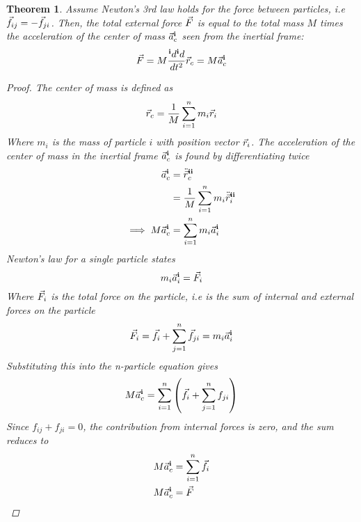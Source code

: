 \documentclass{article}
\newtheorem{theorem}{Theorem}
\begin{document}
\begin{theorem}
    Assume Newton's 3rd law holds for the force between particles, i.e $\vec{f}_{ij} = -\vec{f}_{ji}$.
    Then, the total external force $\vec{F}$ is equal to the total mass $M$ times the acceleration of the 
    center of mass $\vec{a}_c^{\mathbf{i}}$ seen from the inertial frame:
    $$\vec{F} = M\frac{{}^{\mathbf{i}}d{}^{\mathbf{i}}d}{dt^2}\vec{r}_c = M\vec{a}_c^{\mathbf{i}}$$
    \begin{proof}
        The center of mass is defined as
        $$\vec{r}_c = \frac{1}{M}\sum_{i=1}^nm_i\vec{r}_i$$
        Where $m_i$ is the mass of particle $i$ with position vector $\vec{r}_i$. The acceleration of the center of mass in the inertial frame $\vec{a}_c^{\mathbf{i}}$ is found by differentiating twice
        \begin{align*}
            \vec{a}_c^{\mathbf{i}} &= \ddot{\vec{r}}_c^{\mathbf{ii}} \\
            &= \frac{1}{M}\sum_{i=1}^nm_i\ddot{\vec{r}}_i^{\mathbf{ii}}\\
            \implies M\vec{a}_c^{\mathbf{i}} &=\sum_{i=1}^nm_i{\vec{a}}_i^{\mathbf{i}}
        \end{align*}
        Newton's law for a single particle states
        $$m_i\vec{a}_i^{\mathbf{i}} = \vec{F}_i$$
        Where $\vec{F}_i$ is the total force on the particle, i.e is the sum of internal and external forces on the particle
        $$\vec{F}_i = \vec{f}_i + \sum_{j=1}^n\vec{f}_{ji} = m_i\vec{a}_i^{\mathbf{i}}$$
        Substituting this into the n-particle equation gives
        $$ M\vec{a}_c^{\mathbf{i}} = \sum_{i=1}^n\left(\vec{f}_i+\sum_{j=1}^nf_{ji}\right)$$
        Since $f_{ij} + f_{ji} = 0$, the contribution from internal forces is zero, and the sum reduces to
        \begin{align*}
            M\vec{a}_c^{\mathbf{i}} &= \sum_{i=1}^n\vec{f}_i \\
            M\vec{a}_c^{\mathbf{i}} &= \vec{F}
        \end{align*}
    \end{proof}
\end{theorem}
\end{document}
